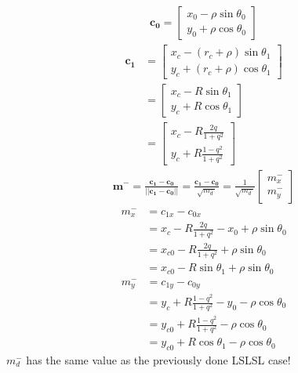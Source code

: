 \documentclass[12pt]{article}
\begin{document}
\begin{align}
    \mathbf{c_0} = \begin{bmatrix}
        x_0 -\rho\sin\theta_0\\
        y_0 + \rho\cos\theta_0
    \end{bmatrix}
\end{align}
\begin{align}
    \mathbf{c_1} &= \begin{bmatrix}
        x_c-(r_c+\rho)\sin\theta_1\\
        y_c + (r_c+\rho)\cos\theta_1
    \end{bmatrix}\\
    &= \begin{bmatrix}
        x_c-R\sin\theta_1\\
        y_c + R\cos\theta_1
    \end{bmatrix}\\
    &= \begin{bmatrix}
        x_c-R\frac{2q}{1+q^2}\\
        y_c + R\frac{1-q^2}{1+q^2}
    \end{bmatrix}
\end{align}
\begin{align}
    \mathbf{m^-} = \frac{\mathbf{c_1} - \mathbf{c_0}}{||\mathbf{c_1} - \mathbf{c_0}||}
    = \frac{\mathbf{c_1} - \mathbf{c_0}}{\sqrt{m^-_d}}
    = \frac{1}{\sqrt{m^-_d}}\begin{bmatrix}
        m^-_x\\
        m^-_y
    \end{bmatrix}
\end{align}
\begin{align}
    m^-_x &= c_{1x} - c_{0x}\\
    &= x_c-R\frac{2q}{1+q^2} - x_0 +\rho\sin\theta_0\\
    &= x_{c0} -R\frac{2q}{1+q^2} +\rho\sin\theta_0\\
    &= x_{c0} -R\sin\theta_1 +\rho\sin\theta_0
\end{align}
\begin{align}
    m^-_y &= c_{1y} - c_{0y}\\
    &= y_c + R\frac{1-q^2}{1+q^2} - y_0 - \rho\cos\theta_0\\
    &= y_{c0} + R\frac{1-q^2}{1+q^2} - \rho\cos\theta_0\\
    &= y_{c0} + R\cos\theta_1 - \rho\cos\theta_0
\end{align}
$m^-_d$ has the same value as the previously done LSLSL case!
\end{document}
